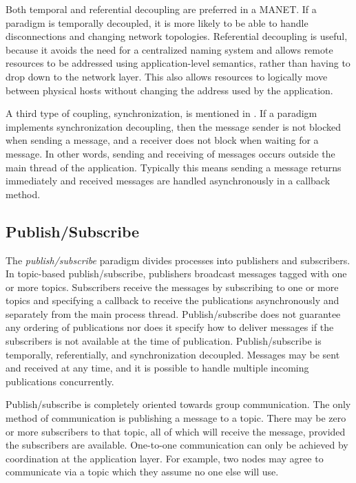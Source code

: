 Both temporal and referential decoupling are preferred in a MANET. If a paradigm is temporally decoupled, it is more likely to be able to handle disconnections and changing network topologies. Referential decoupling is useful, because it avoids the need for a centralized naming system and allows remote resources to be addressed using application-level semantics, rather than having to drop down to the network layer. This also allows resources to logically move between physical hosts without changing the address used by the application.

A third type of coupling, synchronization, is mentioned in \cite{psfaces}. If a paradigm implements synchronization decoupling, then the message sender is not blocked when sending a message, and a receiver does not block when waiting for a message. In other words, sending and receiving of messages occurs outside the main thread of the application. Typically this means sending a message returns immediately and received messages are handled asynchronously in a callback method.

\subsection{Publish/Subscribe}\label{sec:pubsub}

The \textit{publish/subscribe} paradigm divides processes into publishers and subscribers. In topic-based publish/subscribe, publishers broadcast messages tagged with one or more topics. Subscribers receive the messages by subscribing to one or more topics and specifying a callback to receive the publications asynchronously and separately from the main process thread. Publish/subscribe does not guarantee any ordering of publications nor does it specify how to deliver messages if the subscribers is not available at the time of publication. Publish/subscribe is temporally, referentially, and synchronization decoupled. Messages may be sent and received at any time, and it is possible to handle multiple incoming publications concurrently.

Publish/subscribe is completely oriented towards group communication. The only method of communication is publishing a message to a topic. There may be zero or more subscribers to that topic, all of which will receive the message, provided the subscribers are available. One-to-one communication can only be achieved by coordination at the application layer. For example, two nodes may agree to communicate via a topic which they assume no one else will use.

